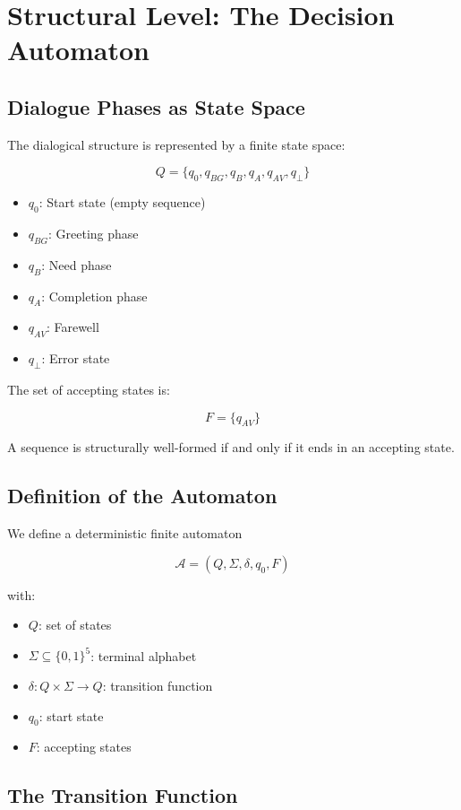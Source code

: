 \documentclass[
  12pt,
  a4paper,
  oneside,
  titlepage
]{article}
\begin{document}
\section{Structural Level: The Decision Automaton}

\subsection{Dialogue Phases as State Space}

The dialogical structure is represented by a finite state space:

\[
Q = \{q_0, q_{BG}, q_B, q_A, q_{AV}, q_\bot\}
\]

\begin{itemize}
    \item \(q_0\): Start state (empty sequence)
    \item \(q_{BG}\): Greeting phase
    \item \(q_B\): Need phase
    \item \(q_A\): Completion phase
    \item \(q_{AV}\): Farewell
    \item \(q_\bot\): Error state
\end{itemize}

The set of accepting states is:

\[
F = \{q_{AV}\}
\]

A sequence is structurally well-formed if and only if it ends in an accepting 
state.

\subsection{Definition of the Automaton}

We define a deterministic finite automaton

\[
\mathcal{A} = (Q, \Sigma, \delta, q_0, F)
\]

with:
\begin{itemize}
    \item \(Q\): set of states
    \item \(\Sigma \subseteq \{0,1\}^5\): terminal alphabet
    \item \(\delta: Q \times \Sigma \to Q\): transition function
    \item \(q_0\): start state
    \item \(F\): accepting states
\end{itemize}

\subsection{The Transition Function}
\end{document}
